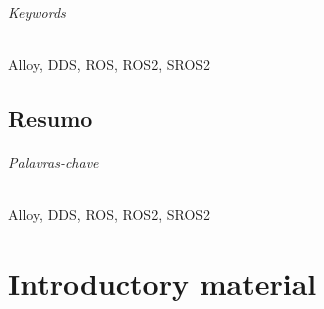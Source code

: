 \documentclass[
  oneside,
  11pt, a4paper,
  footinclude=true,
  headinclude=true,
  cleardoublepage=empty
]{scrbook}
\begin{document}
\paragraph{Keywords} Alloy, DDS, ROS, ROS2, SROS2
	\cleardoublepage

\chapter*{Resumo}
	
	

\paragraph{Palavras-chave} Alloy, DDS, ROS, ROS2, SROS2


	\cleardoublepage

	\setcounter{page}{3}

	\cleardoublepage
	\tableofcontents

	\cleardoublepage
	\listoffigures



	\cleardoublepage
	\setcounter{page}{3}

\part{Introductory material}








\end{document}
